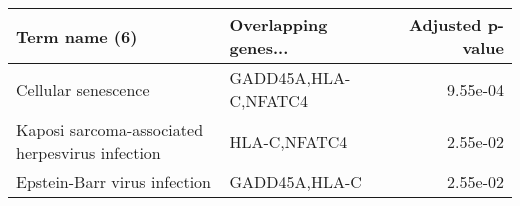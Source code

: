 \begin{tabular}{llr}
\toprule
                                  Term name (6) & Overlapping genes... &  Adjusted p-value \\
\midrule
                            Cellular senescence & GADD45A,HLA-C,NFATC4 &          9.55e-04 \\
Kaposi sarcoma-associated herpesvirus infection &         HLA-C,NFATC4 &          2.55e-02 \\
                   Epstein-Barr virus infection &        GADD45A,HLA-C &          2.55e-02 \\
\bottomrule
\end{tabular}
